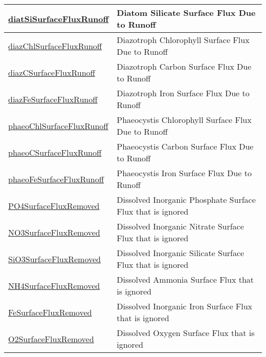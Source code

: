 {\begin{center}
\begin{longtable}{| p{2.0in} | p{4.0in} |}
    \hline
    \hyperref[subsec:var_sec_tracersSurfaceFlux_diatSiSurfaceFluxRunoff]{diatSiSurfaceFluxRunoff} & Diatom Silicate Surface Flux Due to Runoff \\
    \hline
    \hyperref[subsec:var_sec_tracersSurfaceFlux_diazChlSurfaceFluxRunoff]{diazChlSurfaceFluxRunoff} & Diazotroph Chlorophyll Surface Flux Due to Runoff \\
    \hline
    \hyperref[subsec:var_sec_tracersSurfaceFlux_diazCSurfaceFluxRunoff]{diazCSurfaceFluxRunoff} & Diazotroph Carbon Surface Flux Due to Runoff \\
    \hline
    \hyperref[subsec:var_sec_tracersSurfaceFlux_diazFeSurfaceFluxRunoff]{diazFeSurfaceFluxRunoff} & Diazotroph Iron Surface Flux Due to Runoff \\
    \hline
    \hyperref[subsec:var_sec_tracersSurfaceFlux_phaeoChlSurfaceFluxRunoff]{phaeoChlSurfaceFluxRunoff} & Phaeocystis Chlorophyll Surface Flux Due to Runoff \\
    \hline
    \hyperref[subsec:var_sec_tracersSurfaceFlux_phaeoCSurfaceFluxRunoff]{phaeoCSurfaceFluxRunoff} & Phaeocystis Carbon Surface Flux Due to Runoff \\
    \hline
    \hyperref[subsec:var_sec_tracersSurfaceFlux_phaeoFeSurfaceFluxRunoff]{phaeoFeSurfaceFluxRunoff} & Phaeocystis Iron Surface Flux Due to Runoff \\
    \hline
    \hyperref[subsec:var_sec_tracersSurfaceFlux_PO4SurfaceFluxRemoved]{PO4SurfaceFluxRemoved} & Dissolved Inorganic Phosphate Surface Flux that is ignored \\
    \hline
    \hyperref[subsec:var_sec_tracersSurfaceFlux_NO3SurfaceFluxRemoved]{NO3SurfaceFluxRemoved} & Dissolved Inorganic Nitrate Surface Flux that is ignored \\
    \hline
    \hyperref[subsec:var_sec_tracersSurfaceFlux_SiO3SurfaceFluxRemoved]{SiO3SurfaceFluxRemoved} & Dissolved Inorganic Silicate Surface Flux that is ignored \\
    \hline
    \hyperref[subsec:var_sec_tracersSurfaceFlux_NH4SurfaceFluxRemoved]{NH4SurfaceFluxRemoved} & Dissolved Ammonia Surface Flux that is ignored \\
    \hline
    \hyperref[subsec:var_sec_tracersSurfaceFlux_FeSurfaceFluxRemoved]{FeSurfaceFluxRemoved} & Dissolved Inorganic Iron Surface Flux that is ignored \\
    \hline
    \hyperref[subsec:var_sec_tracersSurfaceFlux_O2SurfaceFluxRemoved]{O2SurfaceFluxRemoved} & Dissolved Oxygen Surface Flux that is ignored \\

\end{longtable}
\end{center}}

